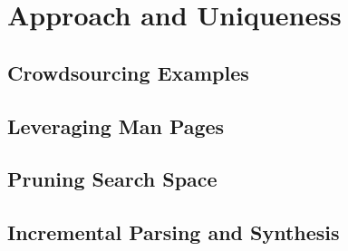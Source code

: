 \section{Approach and Uniqueness}
\subsection{Crowdsourcing Examples}
\subsection{Leveraging Man Pages}
\subsection{Pruning Search Space}
\subsection{Incremental Parsing and Synthesis}